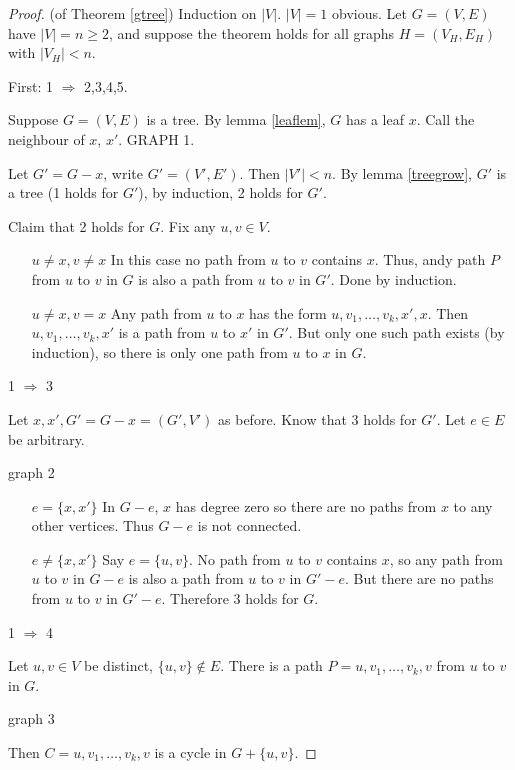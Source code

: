 \documentclass{article}
\begin{document}
\begin{proof}
(of Theorem \ref{gtree}) Induction on $|V|$. $|V|=1$ obvious.  Let $G=(V,E)$ have $|V| = n \geq 2$, and suppose the theorem holds for all graphs $H=(V_H, E_H)$ with $|V_H| <n$.

First: 1 $\Rightarrow$ 2,3,4,5.

Suppose $G = (V,E)$ is a tree.  By lemma \ref{leaflem}, $G$ has a leaf $x$.  Call the neighbour of $x$, $x'$. GRAPH 1.

Let $G'=G-x$, write $G'= (V', E')$.  Then $|V'| <n $.  By lemma \ref{treegrow}, $G'$ is a tree (1 holds for $G'$), by induction, 2 holds for $G'$.

Claim that 2 holds for $G$.  Fix any $u,v \in V$.

\begin{itemize}
 \item[$u\neq x, v\neq x$] In this case no path from $u$ to $v$ contains $x$.  Thus, andy path $P$ from $u$ to $v$ in $G$ is also a path from $u$ to $v$ in $G'$.  Done by induction.
\item[$u\neq x, v = x$]  Any path from $u$ to $x$ has the form $u, v_1, \ldots, v_k, x', x$.  Then $u, v_1, \ldots, v_k, x'$ is a path from $u$ to $x'$ in $G'$.  But only one such path exists (by induction), so there is only one path from $u$ to $x$ in $G$.
\end{itemize}

1 $\Rightarrow$ 3

Let $x,x', G' = G -x = (G',V')$ as before.  Know that 3 holds for $G'$.  Let $e \in E$ be arbitrary.

graph 2

\begin{itemize}
 \item[$e= \{x,x'\}$] In $G - e$, $x$ has degree zero so there are no paths from $x$ to any other vertices. Thus $G-e$ is not connected.
\item[$e \neq \{x,x'\}$] Say $e = \{u,v\}$.  No path from $u$ to $v$ contains $x$, so any path from $u$ to $v$ in $G-e$ is also a path from $u$ to $v$ in $G' - e$.  But there are no paths from $u$ to $v$ in $G'-e$.  Therefore 3 holds for $G$.
\end{itemize}

1 $\Rightarrow$ 4

Let $u,v \in V$ be distinct, $\{u,v\} \notin E$.  There is a path $P=u,v_1,\ldots, v_k, v$ from $u$ to $v$ in $G$.

graph 3

Then $C= u, v_1, \ldots, v_k, v$ is a cycle in $G+\{u,v\}$.


\end{proof}
\end{document}
